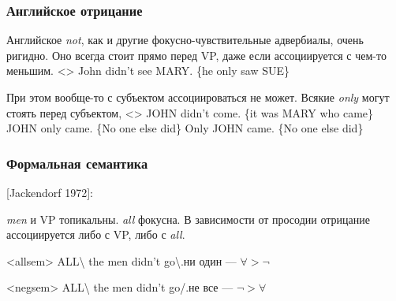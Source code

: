 \documentclass{beamer}
\begin{document}
\begin{frame}
    \frametitle{Английское отрицание}

    Английское \textit{not}, как и другие фокусно-чувствительные адвербиалы, очень ригидно. Оно всегда стоит прямо перед VP, даже если ассоциируется с чем-то меньшим.
    \ex<>
        John didn't see MARY. \{he only saw SUE\}
    \xe

    При этом вообще-то с субъектом ассоциироваться не может. Всякие \textit{only} могут стоять перед субъектом, 
    \pex<>
        \a \ljudge* JOHN didn't come. \{it was MARY who came\}
        \a \ljudge* JOHN only came. \{No one else did\}
        \a {} Only JOHN came. \{No one else did\}
    \xe

\end{frame}

\begin{frame}
    \frametitle{Формальная семантика}

    [Jackendorf 1972]:

    \textit{men} и VP топикальны. \textit{all} фокусна. В зависимости от просодии отрицание ассоциируется либо с VP, либо с \textit{all}.

    \ex<allsem>
        \uppercase{All}\textbackslash{} the men didn't go\textbackslash.\hfill ни один — $\forall>\neg$
        

    \xe

    \ex<negsem>
        \uppercase{All}\textbackslash{} the men didn't go/.\hfill не все — $\neg>\forall$
        

    \xe

\end{frame}

\end{document}
